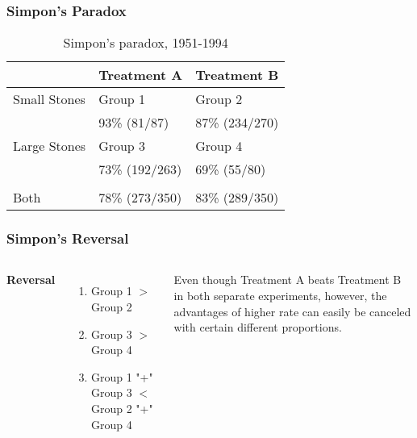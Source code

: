 \documentclass{beamer}
\begin{document}
\begin{frame}
\frametitle{Simpon's Paradox}

\begin{table}
\begin{tabular}{l l l}
\toprule
 & Treatment A  & Treatment B \\
\midrule
Small Stones & Group 1 & Group 2 \\
& 93\% (81/87) & 87\% (234/270) \\
Large Stones & Group 3 & Group 4 \\
& 73\% (192/263) & 69\% (55/80) \\
\\
Both & 78\% (273/350) &	83\% (289/350) \\
\bottomrule
\end{tabular}
\caption{Simpon's paradox, 1951-1994}
\end{table}

\end{frame}


\begin{frame}
\frametitle{Simpon's Reversal}
\begin{columns}[c] %

\textbf{Reversal}
\begin{enumerate}
\item Group 1 $>$ Group 2
\item Group 3 $>$ Group 4
\item Group 1 "+" Group 3 $<$ Group 2 "+" Group 4
\end{enumerate}

Even though Treatment A beats Treatment B in both separate experiments, however, the advantages of higher 
rate can easily be canceled with certain different proportions.

\end{columns}
\end{frame}

\end{document}

